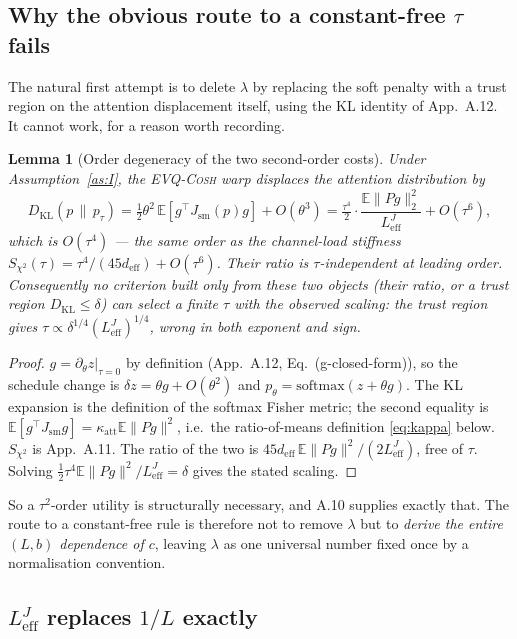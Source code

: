 \documentclass[11pt]{article}
\newtheorem{lemma}[theorem]{Lemma}
\theoremstyle{definition}
\newcommand{\evq}{\textsc{EVQ-Cosh}}
\newcommand{\deff}{d_{\mathrm{eff}}}
\newcommand{\Leff}{L_{\mathrm{eff}}^{J}}
\newcommand{\E}{\mathbb{E}}
\begin{document}
\subsection{Why the obvious route to a constant-free \texorpdfstring{$\tau$}{tau} fails}

The natural first attempt is to delete $\lambda$ by replacing the soft penalty with a trust region
on the attention displacement itself, using the KL identity of App.~A.12. It cannot work, for a
reason worth recording.

\begin{lemma}[Order degeneracy of the two second-order costs]\label{lem:degeneracy}
Under Assumption~\ref{as:I}, the \evq{} warp displaces the attention distribution by
\[
D_{\mathrm{KL}}\!\left(p\,\|\,p_\tau\right)=\tfrac12\theta^2\,\E\!\left[g^\top J_{\mathrm{sm}}(p)g\right]+O(\theta^3)
=\tfrac{\tau^4}{2}\cdot\frac{\E\|P g\|_2^2}{\Leff}+O(\tau^6),
\]
which is $O(\tau^4)$ --- the same order as the channel-load stiffness
$S_{\chi^2}(\tau)=\tau^4/(45\deff)+O(\tau^6)$. Their ratio is $\tau$-independent at leading order.
Consequently no criterion built only from these two objects (their ratio, or a trust region
$D_{\mathrm{KL}}\le\delta$) can select a finite $\tau$ with the observed scaling: the trust region
gives $\tau\propto\delta^{1/4}(\Leff)^{1/4}$, wrong in both exponent and sign.
\end{lemma}

\begin{proof}
$g=\partial_\theta z|_{\tau=0}$ by definition (App.~A.12, Eq.~(g-closed-form)), so the schedule
change is $\delta z=\theta g+O(\theta^2)$ and $p_\theta=\mathrm{softmax}(z+\theta g)$. The KL
expansion is the definition of the softmax Fisher metric; the second equality is
$\E[g^\top J_{\mathrm{sm}}g]=\kappa_{\mathrm{att}}\E\|Pg\|^2$, i.e.\ the ratio-of-means definition
\eqref{eq:kappa} below. $S_{\chi^2}$ is App.~A.11. The ratio of the two is
$45\deff\,\E\|Pg\|^2/(2\Leff)$, free of $\tau$. Solving $\tfrac12\tau^4\E\|Pg\|^2/\Leff=\delta$
gives the stated scaling.
\end{proof}

So a $\tau^2$-order utility is structurally necessary, and A.10 supplies exactly that. The route to
a constant-free rule is therefore not to remove $\lambda$ but to \emph{derive the entire $(L,b)$
dependence of $c$}, leaving $\lambda$ as one universal number fixed once by a normalisation
convention.

\subsection{\texorpdfstring{$\Leff$}{Leff} replaces \texorpdfstring{$1/L$}{1/L} exactly}
\end{document}
